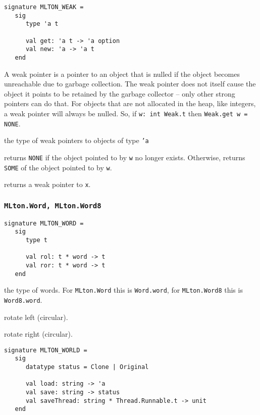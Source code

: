 \begin{verbatim}
signature MLTON_WEAK =
   sig
      type 'a t

      val get: 'a t -> 'a option
      val new: 'a -> 'a t
   end
\end{verbatim}

A weak pointer is a pointer to an object that is nulled if the
object becomes unreachable due to garbage collection.  The weak
pointer does not itself cause the object it points to be retained by
the garbage collector -- only other strong pointers can do that.
For objects that are not allocated in the heap, like integers, a weak
pointer will always be nulled.  So, if {\tt w: int Weak.t} then
{\tt Weak.get w = NONE}.

\begin{description}
the type of weak pointers to objects of type {\tt 'a}

returns {\tt NONE} if the object pointed to by {\tt w} no longer
exists.  Otherwise, returns {\tt SOME} of the object pointed to by
{\tt w}.

returns a weak pointer to {\tt x}.
\end{description}
%
\subsubsection{\tt MLton.Word, MLton.Word8}

\begin{verbatim}
signature MLTON_WORD =
   sig
      type t
         
      val rol: t * word -> t
      val ror: t * word -> t
   end
\end{verbatim}

\begin{description}
the type of words.  For {\tt MLton.Word} this is {\tt Word.word}, for
{\tt MLton.Word8} this is {\tt Word8.word}.

rotate left (circular).

rotate right (circular).
\end{description}


\begin{verbatim}
signature MLTON_WORLD =
   sig
      datatype status = Clone | Original

      val load: string -> 'a
      val save: string -> status
      val saveThread: string * Thread.Runnable.t -> unit
   end
\end{verbatim}

